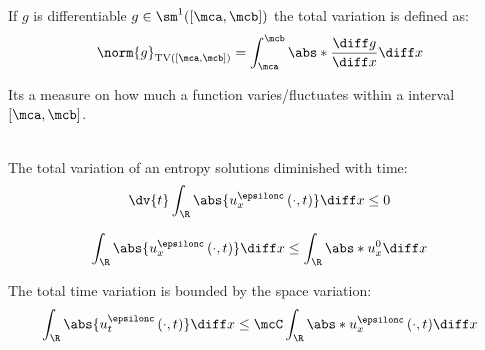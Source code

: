 \begin{defnbox}\nospacing
    \begin{defn}\label{defn:total_variation}
        If $g$ is differentiable $g\in\sm^{1}([\mca,\mcb])$ the total variation is defined as:
        \begin{align}
          \norm{g}_{\text{TV}([\mca,\mcb])}=\int_{\mca}^{\mcb}\abs*{\frac{\diff g}{\diff x}}\diff x
        \end{align}
    \end{defn}
\end{defnbox}
\begin{explanationbox}\nospacing
    \begin{explanation}
        Its a measure on how much a function varies/fluctuates within a interval $[\mca,\mcb]$.
    \end{explanation}
\end{explanationbox}
\begin{theorembox}\nospacing
    \begin{theorem}\label{theorem:diminishing_total_variation}\leavevmode\\
        The total variation of an entropy solutions diminished with time:
        \begin{align}
          \dv{t}\int_{\R}\abs{u_{x}^{\epsilonc}\left(\cdot,t\right)}\diff x\leq0
        \end{align}
        \begin{figure}[H]
            \centering{
              \def\svgwidth{150pt}
              \resizebox{0.6\linewidth}{!}{}
            }
        \end{figure}
    \end{theorem}
\end{theorembox}
\begin{corbox}\nospacing
    \begin{cor}
        \begin{align}
          \int_{\R}\abs{u_{x}^{\epsilonc}\left(\cdot,t\right)}\diff x\leq\int_{\R}\abs*{u_{x}^{0}}\diff x
        \end{align}
    \end{cor}
\end{corbox}
\begin{corbox}\nospacing
    \begin{cor}\label{cor:total_variation_diminishing_in_time}
        The total time variation is bounded by the space variation:
        \begin{align}
          \int_{\R}\abs{u_{t}^{\epsilonc}\left(\cdot,t\right)}\diff x\leq\mcC\int_{\R}\abs*{u_{x}^{\epsilonc}\left(\cdot,t\right)}\diff x
        \end{align}
    \end{cor}
\end{corbox}
